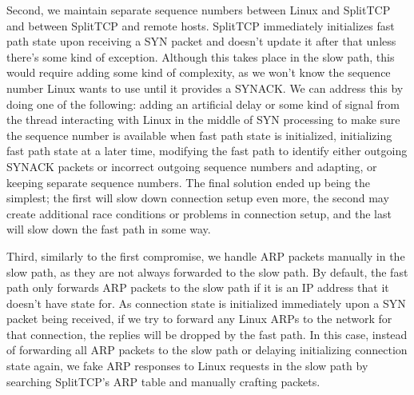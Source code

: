 Second, we maintain separate sequence numbers between Linux and SplitTCP and 
between SplitTCP and remote hosts. SplitTCP immediately initializes fast path 
state upon receiving a SYN packet and doesn't update it after that unless 
there's some kind of exception. Although this takes place in the slow path,
this would require adding some kind of complexity, as we won't know the sequence
number Linux wants to use until it provides a SYNACK. We can address this by 
doing one of the following: adding an artificial delay or some kind of signal 
from the thread interacting with Linux in the middle of SYN processing to make 
sure the sequence number is available when fast path state is initialized, 
initializing fast path state at a later time, modifying the fast path to 
identify either outgoing SYNACK packets or incorrect outgoing sequence numbers
and adapting, or keeping separate sequence numbers. The final solution ended up 
being the simplest; the first will slow down connection setup even more, the 
second may create additional race conditions or problems in connection setup, 
and the last will slow down the fast path in some way.

Third, similarly to the first compromise, we handle ARP packets manually in 
the slow path, as they are not always forwarded to the slow path. By default,
the fast path only forwards ARP packets to the slow path if it is an IP address
that it doesn't have state for. As connection state is initialized immediately 
upon a SYN packet being received, if we try to forward any Linux ARPs to the 
network for that connection, the replies will be dropped by the fast path. In
this case, instead of forwarding all ARP packets to the slow path or delaying
initializing connection state again, we fake ARP responses to Linux requests 
in the slow path by searching SplitTCP's ARP table and manually crafting 
packets. 

